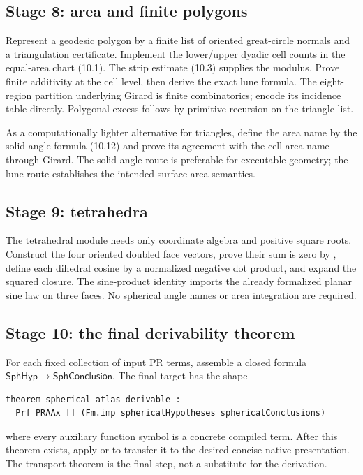 \subsection{Stage 8: area and finite polygons}

Represent a geodesic polygon by a finite list of oriented great-circle normals
and a triangulation certificate.  Implement the lower/upper dyadic cell counts
in the equal-area chart (10.1).  The strip estimate (10.3) supplies the modulus.
Prove finite additivity at the cell level, then derive the exact lune formula.
The eight-region partition underlying Girard is finite combinatorics; encode
its incidence table directly.  Polygonal excess follows by primitive recursion
on the triangle list.

As a computationally lighter alternative for triangles, define the area name
by the solid-angle formula (10.12) and prove its agreement with the cell-area
name through Girard.  The solid-angle route is preferable for executable
geometry; the lune route establishes the intended surface-area semantics.

\subsection{Stage 9: tetrahedra}

The tetrahedral module needs only coordinate algebra and positive square
roots.  Construct the four oriented doubled face vectors, prove their sum is
zero by , define each dihedral cosine by a normalized negative dot
product, and expand the squared closure.  The sine-product identity imports the
already formalized planar sine law on three faces.  No spherical angle names or
area integration are required.

\subsection{Stage 10: the final derivability theorem}

For each fixed collection of input PR terms, assemble a closed formula
\(\mathsf{SphHyp}\to\mathsf{SphConclusion}\).  The final target has the shape
\begin{lstlisting}[language={}]
theorem spherical_atlas_derivable :
  Prf PRAAx [] (Fm.imp sphericalHypotheses sphericalConclusions)
\end{lstlisting}
where every auxiliary function symbol is a concrete compiled  term.
After this theorem exists, apply  or
 to transfer it to the desired concise native
presentation.  The transport theorem is the final step, not a substitute for
the derivation.

